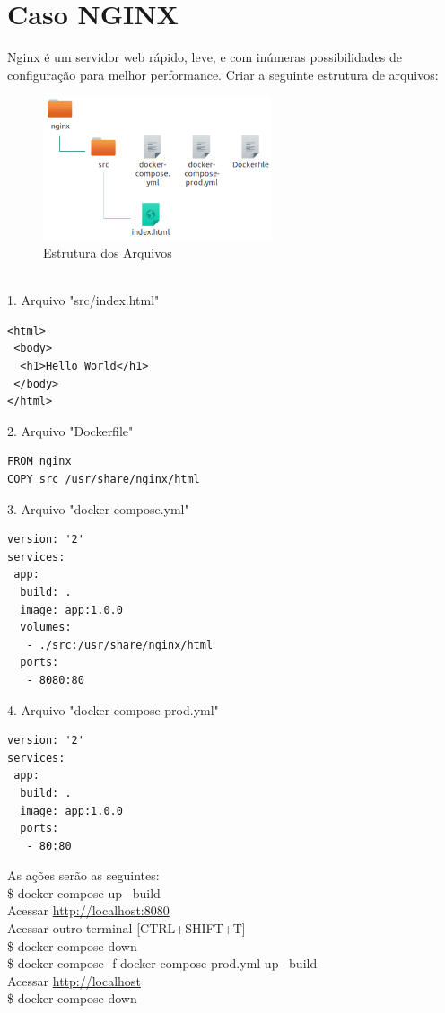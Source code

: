 \documentclass[a4paper,11pt]{article}
\begin{document}
\section{Caso NGINX}
Nginx é um servidor web rápido, leve, e com inúmeras possibilidades de configuração para melhor performance. Criar a seguinte estrutura de arquivos:
\begin{figure}[!htb]
	\centering
	\includegraphics[width=0.6\textwidth]{imagem/estnginx.png}
	\caption{Estrutura dos Arquivos}
\end{figure} \\
1. Arquivo "src/index.html"
\begin{lstlisting}
<html>
 <body>
  <h1>Hello World</h1>
 </body>
</html>
\end{lstlisting}
2. Arquivo "Dockerfile"
\begin{lstlisting}
FROM nginx
COPY src /usr/share/nginx/html
\end{lstlisting}
3. Arquivo "docker-compose.yml"
\begin{lstlisting}
version: '2'
services:
 app:
  build: .
  image: app:1.0.0
  volumes:
   - ./src:/usr/share/nginx/html
  ports:
   - 8080:80 
\end{lstlisting}
4. Arquivo "docker-compose-prod.yml"
\begin{lstlisting}
version: '2'
services:
 app:
  build: .
  image: app:1.0.0
  ports:
   - 80:80 
\end{lstlisting}
As ações serão as seguintes: \\
{\ttfamily\$ docker-compose up --build} \\
Acessar \url{http://localhost:8080} \\
Acessar outro terminal [CTRL+SHIFT+T] \\
{\ttfamily\$ docker-compose down} \\
{\ttfamily\$ docker-compose -f docker-compose-prod.yml up --build} \\
Acessar \url{http://localhost} \\
{\ttfamily\$ docker-compose down}
\end{document}
